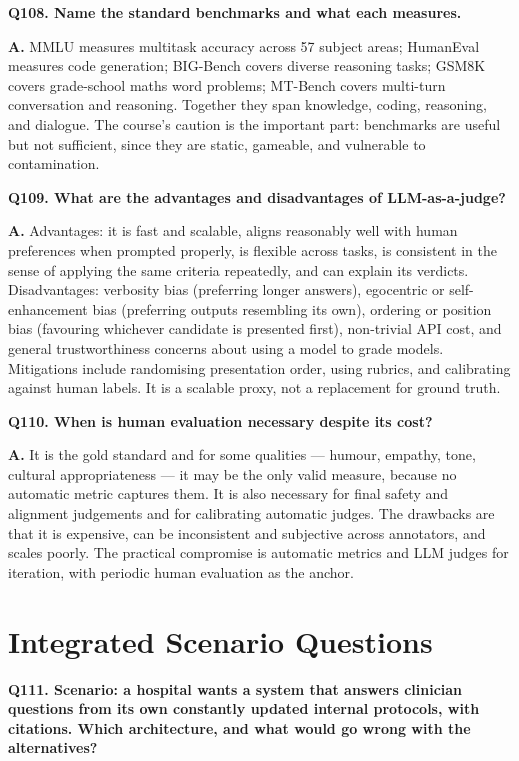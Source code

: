 \documentclass[11pt]{article}
\begin{document}
\medskip
\noindent\textbf{Q108. Name the standard benchmarks and what each measures.}

\noindent\textbf{A.} MMLU measures multitask accuracy across 57 subject areas; HumanEval measures code generation; BIG-Bench covers diverse reasoning tasks; GSM8K covers grade-school maths word problems; MT-Bench covers multi-turn conversation and reasoning. Together they span knowledge, coding, reasoning, and dialogue. The course's caution is the important part: benchmarks are useful but not sufficient, since they are static, gameable, and vulnerable to contamination.

\medskip
\noindent\textbf{Q109. What are the advantages and disadvantages of LLM-as-a-judge?}

\noindent\textbf{A.} Advantages: it is fast and scalable, aligns reasonably well with human preferences when prompted properly, is flexible across tasks, is consistent in the sense of applying the same criteria repeatedly, and can explain its verdicts. Disadvantages: verbosity bias (preferring longer answers), egocentric or self-enhancement bias (preferring outputs resembling its own), ordering or position bias (favouring whichever candidate is presented first), non-trivial API cost, and general trustworthiness concerns about using a model to grade models. Mitigations include randomising presentation order, using rubrics, and calibrating against human labels. It is a scalable proxy, not a replacement for ground truth.

\medskip
\noindent\textbf{Q110. When is human evaluation necessary despite its cost?}

\noindent\textbf{A.} It is the gold standard and for some qualities --- humour, empathy, tone, cultural appropriateness --- it may be the only valid measure, because no automatic metric captures them. It is also necessary for final safety and alignment judgements and for calibrating automatic judges. The drawbacks are that it is expensive, can be inconsistent and subjective across annotators, and scales poorly. The practical compromise is automatic metrics and LLM judges for iteration, with periodic human evaluation as the anchor.

\section{Integrated Scenario Questions}

\noindent\textbf{Q111. Scenario: a hospital wants a system that answers clinician questions from its own constantly updated internal protocols, with citations. Which architecture, and what would go wrong with the alternatives?}
\end{document}
